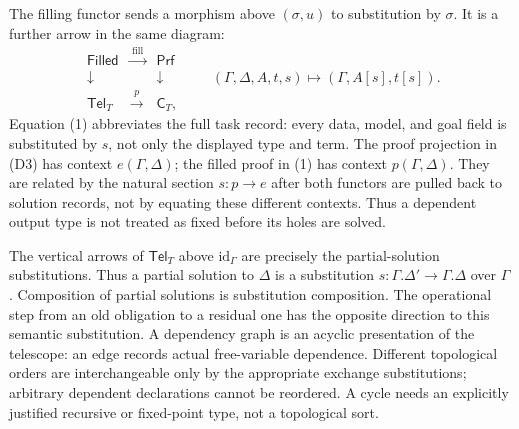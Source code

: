 \documentclass[11pt]{article}
\newcommand{\Cat}[1]{\mathsf{#1}}
\begin{document}
The filling functor sends a morphism above $(\sigma,u)$ to substitution
by $\sigma$. It is a further arrow in the same diagram:
\[
\begin{array}{ccc}
 \Cat{Filled}&\xrightarrow{\ \mathrm{fill}\ }&\Cat{Prf}\\
 \downarrow&&\downarrow\\
 \Cat{Tel}_T&\xrightarrow{\ p\ }&\Cat C_T,
\end{array}\qquad
 (\Gamma,\Delta,A,t,s)\longmapsto(\Gamma,A[s],t[s]).             \tag{1}
\]
Equation (1) abbreviates the full task record: every data, model, and
goal field is substituted by $s$, not only the displayed type and term.
The proof projection in (D3) has context $e(\Gamma,\Delta)$;
the filled proof in (1) has context $p(\Gamma,\Delta)$.
They are related by the natural section $s:p\to e$ after both functors
are pulled back to solution records, not by equating these different contexts. Thus a dependent output type
is not treated as fixed before its holes are solved.

The vertical arrows of $\Cat{Tel}_T$ above $\mathrm{id}_\Gamma$
are precisely the partial-solution substitutions. Thus a partial solution
to $\Delta$ is a substitution
$s:\Gamma.\Delta'\to\Gamma.\Delta$ over $\Gamma$. Composition of
partial solutions is substitution composition. The operational step
from an old obligation to a residual one has the opposite direction to
this semantic substitution. A dependency graph is an acyclic presentation
of the telescope: an edge records actual free-variable dependence.
Different topological orders are interchangeable only by the appropriate
exchange substitutions; arbitrary dependent declarations cannot be reordered.
A cycle needs an explicitly justified recursive or fixed-point type,
not a topological sort.
\end{document}
